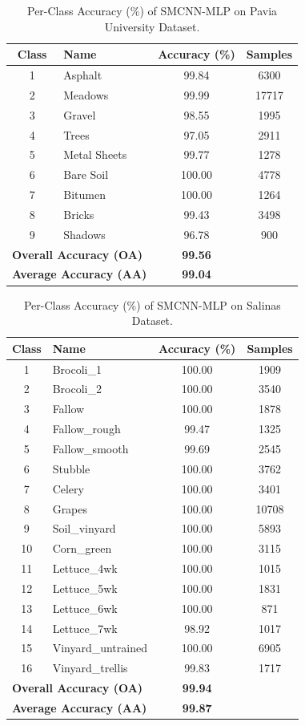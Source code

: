 \documentclass[pdflatex,sn-mathphys-num,iicol]{sn-jnl}
\begin{document}
\begin{table}[htbp]
\centering
\caption{Per-Class Accuracy (\%) of SMCNN-MLP on Pavia University Dataset.}
\label{tab:paviau_class}
\begin{tabular}{clcc}
\toprule
\textbf{Class} & \textbf{Name} & \textbf{Accuracy (\%)} & \textbf{Samples} \\
\midrule
1 & Asphalt & 99.84 & 6300 \\
2 & Meadows & 99.99 & 17717 \\
3 & Gravel & 98.55 & 1995 \\
4 & Trees & 97.05 & 2911 \\
5 & Metal Sheets & 99.77 & 1278 \\
6 & Bare Soil & 100.00 & 4778 \\
7 & Bitumen & 100.00 & 1264 \\
8 & Bricks & 99.43 & 3498 \\
9 & Shadows & 96.78 & 900 \\
\midrule
\multicolumn{2}{l}{\textbf{Overall Accuracy (OA)}} & \textbf{99.56} & \\
\multicolumn{2}{l}{\textbf{Average Accuracy (AA)}} & \textbf{99.04} & \\
\bottomrule
\end{tabular}
\end{table}

\begin{table}[htbp]
\centering
\caption{Per-Class Accuracy (\%) of SMCNN-MLP on Salinas Dataset.}
\label{tab:salinas_class}
\begin{tabular}{clcc}
\toprule
\textbf{Class} & \textbf{Name} & \textbf{Accuracy (\%)} & \textbf{Samples} \\
\midrule
1 & Brocoli\_1 & 100.00 & 1909 \\
2 & Brocoli\_2 & 100.00 & 3540 \\
3 & Fallow & 100.00 & 1878 \\
4 & Fallow\_rough & 99.47 & 1325 \\
5 & Fallow\_smooth & 99.69 & 2545 \\
6 & Stubble & 100.00 & 3762 \\
7 & Celery & 100.00 & 3401 \\
8 & Grapes & 100.00 & 10708 \\
9 & Soil\_vinyard & 100.00 & 5893 \\
10 & Corn\_green & 100.00 & 3115 \\
11 & Lettuce\_4wk & 100.00 & 1015 \\
12 & Lettuce\_5wk & 100.00 & 1831 \\
13 & Lettuce\_6wk & 100.00 & 871 \\
14 & Lettuce\_7wk & 98.92 & 1017 \\
15 & Vinyard\_untrained & 100.00 & 6905 \\
16 & Vinyard\_trellis & 99.83 & 1717 \\
\midrule
\multicolumn{2}{l}{\textbf{Overall Accuracy (OA)}} & \textbf{99.94} & \\
\multicolumn{2}{l}{\textbf{Average Accuracy (AA)}} & \textbf{99.87} & \\
\bottomrule
\end{tabular}
\end{table}
\end{document}
